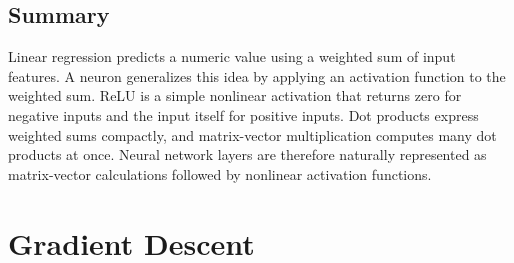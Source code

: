 \documentclass[11pt,openany,oneside]{book}
\begin{document}
\section{Summary}

Linear regression predicts a numeric value using a weighted sum of input
features. A neuron generalizes this idea by applying an activation function to
the weighted sum. ReLU is a simple nonlinear activation that returns zero for
negative inputs and the input itself for positive inputs. Dot products express
weighted sums compactly, and matrix-vector multiplication computes many dot
products at once. Neural network layers are therefore naturally represented as
matrix-vector calculations followed by nonlinear activation functions.


\chapter{Gradient Descent}
\end{document}
